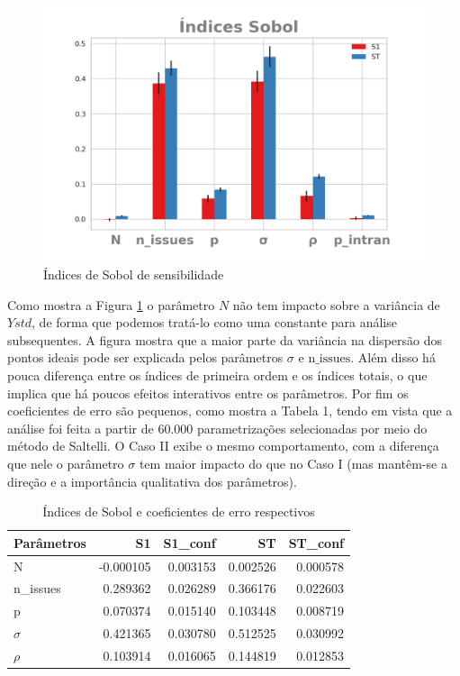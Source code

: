 \begin{figure}[H]
  \centering
  \includegraphics{ims/barplotmuto5k.png}
  \caption{Índices de Sobol de sensibilidade}
  \label{fig:sobol1}
\end{figure}

Como mostra a Figura \ref{fig:sobol1} o parâmetro \(N\) não tem impacto sobre a
variância de \(Ystd\), de forma que podemos tratá-lo como uma constante para
análise subsequentes. A figura mostra que a maior parte da variância na
dispersão dos pontos ideais pode ser explicada pelos parâmetros \(\sigma\) e
\(\text{n\_issues}\). Além disso há pouca diferença entre os índices de primeira
ordem e os índices totais, o que implica que há poucos efeitos interativos entre
os parâmetros. Por fim os coeficientes de erro são pequenos, como mostra a
Tabela 1, tendo em vista que a análise foi feita a partir de 60.000
parametrizações selecionadas por meio do método de Saltelli. O Caso II exibe o
mesmo comportamento, com a diferença que nele o parâmetro \(\sigma\) tem maior
impacto do que no Caso I (mas mantêm-se a direção e a importância qualitativa dos
parâmetros).


\begin{table}[H]
\centering
\caption{Índices de Sobol e coeficientes de erro respectivos}
\label{my-label}
\begin{tabular}{|l|r|r|r|r|}
\hline
\rowcolor[HTML]{C0C0C0} 
Parâmetros & S1        & S1\_conf & ST       & ST\_conf \\ \hline
N          & -0.000105 & 0.003153 & 0.002526 & 0.000578 \\ \hline
n\_issues  & 0.289362  & 0.026289 & 0.366176 & 0.022603 \\ \hline
p          & 0.070374  & 0.015140 & 0.103448 & 0.008719 \\ \hline
\(\sigma\) & 0.421365  & 0.030780 & 0.512525 & 0.030992 \\ \hline
\(\rho\)   & 0.103914  & 0.016065 & 0.144819 & 0.012853 \\ \hline
\end{tabular}
\end{table}


